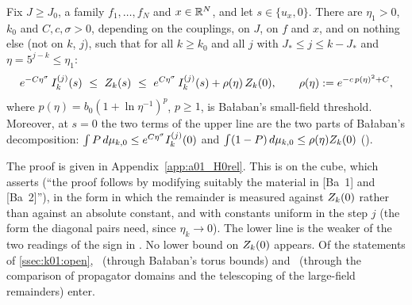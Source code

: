 \begin{proposition}\label{prop:k01:H0rel}
Fix $J\ge J_0$, a family $f_1,\dots,f_N$ and $x\in\mathbb R^N$, and let $s\in\{u_x,0\}$. There are $\eta_1>0$, $k_0$ and $C,c,\sigma>0$, depending on the couplings, on $J$, on $f$ and $x$, and on nothing else (not on $k$, $j$), such that for all $k\ge k_0$ and all $j$ with $J_*\le j\le k-J_*$ and $\eta=5^{j-k}\le\eta_1$:
\begin{equation}\label{eq:k01:H0rel}
e^{-C\eta^{\sigma}}\,\Ik{j}(s)\ \le\ \Zk(s)\ \le\ e^{C\eta^{\sigma}}\,\Ik{j}(s)+\rho(\eta)\,\Zk(0),\qquad \rho(\eta)\defeq e^{-c\,p(\eta)^2+C},
\end{equation}
where $p(\eta)=b_0(1+\ln\eta^{-1})^{p}$, $p\ge1$, is Ba{\l}aban's small-field threshold. Moreover, at $s=0$ the two terms of the upper line are the two parts of Ba{\l}aban's decomposition: $\int P\,d\mu_{k,0}\le e^{C\eta^\sigma}I^{(j)}_{k}(0)$ and $\int(1-P)\,d\mu_{k,0}\le\rho(\eta)Z_{k}(0)$ \textup{(\Rzero)}.
\end{proposition}
The proof is given in Appendix~\ref{app:a01_H0rel}. This is \cite[Thm.~3.1]{K1} on the cube, which \cite[Sect.~5.2]{K2} asserts (``the proof follows by modifying suitably the material in [Ba~1] and [Ba~2]''), in the form in which the remainder is measured against $Z_{k}(0)$ rather than against an absolute constant, and with constants uniform in the step $j$ (the form the diagonal pairs need, since $\eta_k\to0$). The lower line is the weaker of the two readings of the sign in \cite[(3.3)]{K1}. No lower bound on $Z_{k}(0)$ appears. Of the statements of \cref{ssec:k01:open}, \BALint\ (through Ba{\l}aban's torus bounds) and \RENorb\ (through the comparison of propagator domains and the telescoping of the large-field remainders) enter.

